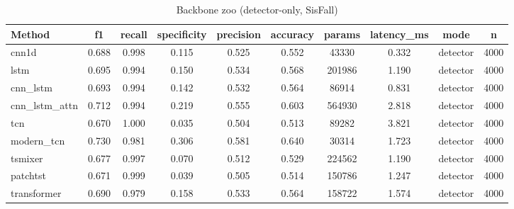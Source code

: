\begin{table}[t]
\centering
\caption{Backbone zoo (detector-only, SisFall)}
\begin{tabular}{lccccccccc}
\toprule
Method & f1 & recall & specificity & precision & accuracy & params & latency_ms & mode & n \\
\midrule
cnn1d & 0.688 & 0.998 & 0.115 & 0.525 & 0.552 & 43330 & 0.332 & detector & 4000 \\
lstm & 0.695 & 0.994 & 0.150 & 0.534 & 0.568 & 201986 & 1.190 & detector & 4000 \\
cnn_lstm & 0.693 & 0.994 & 0.142 & 0.532 & 0.564 & 86914 & 0.831 & detector & 4000 \\
cnn_lstm_attn & 0.712 & 0.994 & 0.219 & 0.555 & 0.603 & 564930 & 2.818 & detector & 4000 \\
tcn & 0.670 & 1.000 & 0.035 & 0.504 & 0.513 & 89282 & 3.821 & detector & 4000 \\
modern_tcn & 0.730 & 0.981 & 0.306 & 0.581 & 0.640 & 30314 & 1.723 & detector & 4000 \\
tsmixer & 0.677 & 0.997 & 0.070 & 0.512 & 0.529 & 224562 & 1.190 & detector & 4000 \\
patchtst & 0.671 & 0.999 & 0.039 & 0.505 & 0.514 & 150786 & 1.247 & detector & 4000 \\
transformer & 0.690 & 0.979 & 0.158 & 0.533 & 0.564 & 158722 & 1.574 & detector & 4000 \\
\bottomrule
\end{tabular}
\end{table}